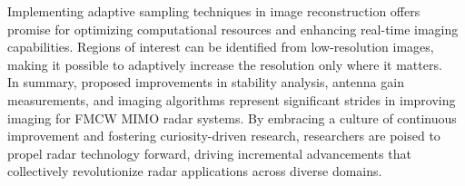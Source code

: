 Implementing adaptive sampling techniques in image reconstruction offers promise for optimizing
computational resources and enhancing real-time imaging capabilities.
Regions of interest can be identified from low-resolution images,
making it possible to adaptively increase the resolution only where it matters.
\\

In summary, proposed improvements in stability analysis,
antenna gain measurements, and imaging algorithms represent significant strides in improving imaging for FMCW MIMO radar systems.
By embracing a culture of continuous improvement and fostering curiosity-driven research,
researchers are poised to propel radar technology forward,
driving incremental advancements that collectively revolutionize radar applications across diverse domains.

